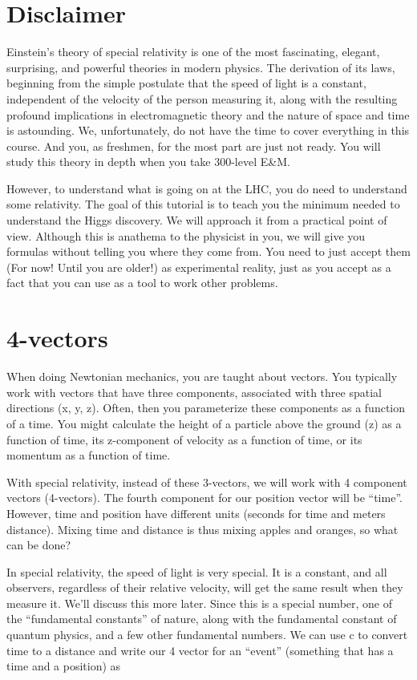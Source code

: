 
\section{Disclaimer}

Einstein’s theory of special relativity is one of the most fascinating, elegant, surprising, and powerful theories in modern physics.  The derivation of its laws, beginning from the simple postulate that the speed of light is a constant, independent of the velocity of the person measuring it, along with the resulting profound implications in electromagnetic theory and the nature of space and time is astounding. We, unfortunately, do not have the time to cover everything in this course.  And you, as freshmen, for the most part are just not ready.  You will study this theory in depth when you take 300-level E\&M.

However, to understand what is going on at the LHC, you do need to understand some relativity.  The goal of this tutorial is to teach you the minimum needed to understand the Higgs discovery.  We will approach it from a practical point of view. Although this is anathema to the physicist in you, we will give you formulas without telling you where they come from.  You need to just accept them (For now!  Until you are older!) as experimental reality, just as you accept   as a fact that you can use as a tool to work other problems.

\section{4-vectors}

When doing Newtonian mechanics, you are taught about vectors.  You typically work with vectors that have three components, associated with three spatial directions (x, y, z).  Often, then you parameterize these components as a function of a time.  You might calculate the height of a particle above the ground (z) as a function of time, its z-component of velocity as a function of time, or its momentum as a function of time.

With special relativity, instead of these 3-vectors, we will work with 4 component vectors (4-vectors).  The fourth component for our position vector will be “time”.  However, time and position have different units (seconds for time and meters distance).  Mixing time and distance is thus mixing apples and oranges, so what can be done?

In special relativity, the speed of light is very special.  It is a constant, and all observers, regardless of their relative velocity, will get the same result when they measure it.  We’ll discuss this more later.  Since this is a special number, one of the “fundamental constants” of nature, along with   the fundamental constant of quantum physics, and a few other fundamental numbers.  We can use c to convert time to a distance and write our 4 vector for an “event” (something that has a time and a position) as

